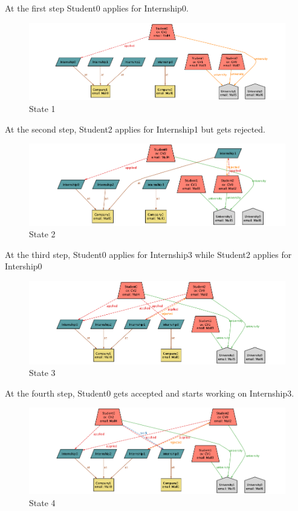 At the first step Student0 applies for Internship0.

\begin{figure} [H]
    \centering
    \includegraphics[width=1\linewidth]{Alloy/State1.png}
    \caption{State 1}
\end{figure}

At the second step, Student2 applies for Internship1 but gets rejected.

\begin{figure} [H]
    \centering
    \includegraphics[width=1\linewidth]{Alloy/State2.png}
    \caption{State 2}
\end{figure}

At the third step, Student0 applies for Internship3 while Student2 applies for Intership0

\begin{figure} [H]
    \centering
    \includegraphics[width=1\linewidth]{Alloy/State3.png}
    \caption{State 3}
\end{figure}

At the fourth step, Student0 gets accepted and starts working on Internship3. 

\begin{figure} [H]
    \centering
    \includegraphics[width=1\linewidth]{Alloy/State4.png}
    \caption{State 4}
\end{figure}

